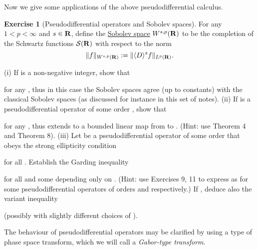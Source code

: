 \documentclass[11pt]{article}
\theoremstyle{definition}
\newtheorem{exercise}[theorem]{Exercise}
\theoremstyle{remark}
\begin{document}
Now we give some applications of the above pseudodifferential calculus.

\begin{exercise}[Pseudodifferential operators and Sobolev spaces]
 \label{sob} For any \({1 < p < \infty}\) and \({s \in {\bf R}}\), define the \href{https://en.wikipedia.org/wiki/Sobolev_space}{Sobolev space} \({W^{s,p}({\bf R})}\) to be the completion of the Schwartz functions \({{\mathcal S}({\bf R})}\) with respect to the norm 
\[\displaystyle  \|f\|_{W^{s,p}({\bf R})} := \| \langle D \rangle^s f \|_{L^p({\bf R})}.\]

(i) If  is a non-negative integer, show that

 for any , thus in this case the Sobolev spaces agree (up to constants) with the classical Sobolev spaces (as discussed for instance in this set of notes). 
(ii) If  is a pseudodifferential operator of some order , show that

 for any , thus  extends to a bounded linear map from  to . (Hint: use Theorem 4 and Theorem 8). 
(iii) Let  be a pseudodifferential operator of some order  that obeys the strong ellipticity condition

 for all . Establish the Garding inequality 

 for all  and some  depending only on . (Hint: use Exercises 9, 11 to express  as  for some pseudodifferential operators  of orders  and  respectively.) If , deduce also the variant inequality 

 (possibly with slightly different choices of ). 


\end{exercise}

The behaviour of pseudodifferential operators may be clarified by using a type of phase space transform, which we will call a \emph{Gabor-type transform}.
\end{document}
